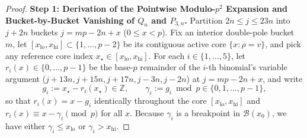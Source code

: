 \documentclass[11pt,reqno]{amsart}
\theoremstyle{definition}
\theoremstyle{remark}
\newcommand{\ZZ}{\mathbb{Z}}
\begin{document}
\begin{proof}
\medskip
\noindent\textbf{Step 1: Derivation of the Pointwise Modulo-$p^2$ Expansion and Bucket-by-Bucket Vanishing of $Q_n$ and $P_{3,n}$.}
Partition $2n \le j \le 23n$ into $j + 2n$ buckets $j = mp - 2n + x$ ($0 \le x < p$). Fix an interior double-pole bucket $m$, let $[x_{\mathrm{lo}}, x_{\mathrm{hi}}] \subset \{1, \ldots, p - 2\}$ be its contiguous active core $\{x : \rho = v\}$, and pick any reference core index $x_\star \in [x_{\mathrm{lo}}, x_{\mathrm{hi}}]$. For each $i \in \{1, \ldots, 5\}$, let $r_i(x) \in \{0, \ldots, p - 1\}$ be the base-$p$ remainder of the $i$-th binomial's variable argument ($j + 13n, j + 15n, j + 17n, j - 3n, j - 2n$) at $j = mp - 2n + x$, and write
\[
  g_i := x_\star - r_i(x_\star) \in \ZZ,
  \qquad
  \gamma_i := g_i \bmod p \in \{0, 1, \ldots, p - 1\},
\]
so that $r_i(x) = x - g_i$ identically throughout the core $[x_{\mathrm{lo}}, x_{\mathrm{hi}}]$ and $r_i(x) \equiv x - \gamma_i \pmod p$ for all $x$. Because $\gamma_i$ is a breakpoint in $\mathcal{B}(x_0)$, we have either $\gamma_i \le x_{\mathrm{lo}}$ or $\gamma_i > x_{\mathrm{hi}}$.


\end{proof}
\end{document}
